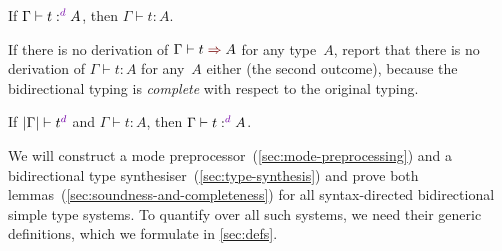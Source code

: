\begin{lemma}[Soundness]
If\/ $\Gamma \vdash t :^\dir{d} A$, then $\Gamma \vdash t : A$.
\end{lemma}

If there is no derivation of $\Gamma \vdash t \syn A$ for any type~$A$, report that there is no derivation of $\Gamma \vdash t : A$ for any~$A$ either (the second outcome), because the bidirectional typing is \emph{complete} with respect to the original typing.

\begin{lemma}[Completeness]
If\/ $|\Gamma| \vdash t^\dir{d}$ and\/ $\Gamma \vdash t : A$, then $\Gamma \vdash t :^\dir{d} A$.
\end{lemma}

We will construct a mode preprocessor~(\cref{sec:mode-preprocessing}) and a bidirectional type synthesiser~(\cref{sec:type-synthesis}) and prove both lemmas~(\cref{sec:soundness-and-completeness}) for all syntax-directed bidirectional simple type systems.
To quantify over all such systems, we need their generic definitions, which we formulate in \cref{sec:defs}.

